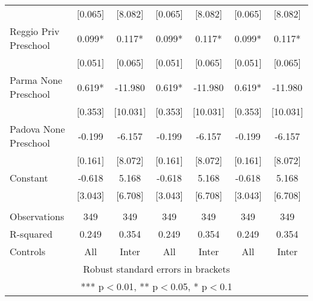 \begin{tabular}{lcccccc}
 & [0.065] & [8.082] & [0.065] & [8.082] & [0.065] & [8.082] \\
Reggio Priv Preschool & 0.099* & 0.117* & 0.099* & 0.117* & 0.099* & 0.117* \\
 & [0.051] & [0.065] & [0.051] & [0.065] & [0.051] & [0.065] \\
Parma None Preschool & 0.619* & -11.980 & 0.619* & -11.980 & 0.619* & -11.980 \\
 & [0.353] & [10.031] & [0.353] & [10.031] & [0.353] & [10.031] \\
Padova None Preschool & -0.199 & -6.157 & -0.199 & -6.157 & -0.199 & -6.157 \\
 & [0.161] & [8.072] & [0.161] & [8.072] & [0.161] & [8.072] \\
Constant & -0.618 & 5.168 & -0.618 & 5.168 & -0.618 & 5.168 \\
 & [3.043] & [6.708] & [3.043] & [6.708] & [3.043] & [6.708] \\
 &  &  &  &  &  &  \\
Observations & 349 & 349 & 349 & 349 & 349 & 349 \\
R-squared & 0.249 & 0.354 & 0.249 & 0.354 & 0.249 & 0.354 \\
 Controls & All & Inter & All & Inter & All & Inter \\ \hline
\multicolumn{7}{c}{ Robust standard errors in brackets} \\
\multicolumn{7}{c}{ *** p$<$0.01, ** p$<$0.05, * p$<$0.1} \\
\end{tabular}
